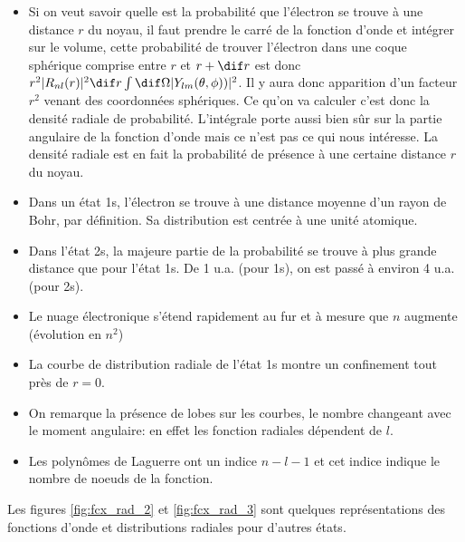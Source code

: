 \begin{itemize}[label=$\bullet$]
    \item Si on veut savoir quelle est la probabilité que l'électron se trouve à une distance $r$ du noyau, il faut prendre le carré de la fonction d'onde et intégrer sur le volume, cette probabilité de trouver l'électron dans une coque sphérique comprise entre $r$ et $r+\dif r$ est donc $r^2|R_{nl}(r)|^2\dif r\int \dif\Omega |Y_{lm}(\theta,\phi))|^2$. Il y aura donc apparition d'un facteur $r^2$ venant des coordonnées sphériques. Ce qu'on va calculer c'est donc la densité radiale de probabilité. L'intégrale porte aussi bien sûr sur la partie angulaire de la fonction d'onde mais ce n'est pas ce qui nous intéresse. La densité radiale est en fait la probabilité de présence à une certaine distance $r$ du noyau.
    \item Dans un état 1s, l'électron se trouve à une distance moyenne d'un rayon de Bohr, par définition. Sa distribution est centrée à une unité atomique.
    \item Dans l'état 2s, la majeure partie de la probabilité se trouve à plus grande distance que pour l'état 1s. De 1 u.a. (pour 1s), on est passé à environ 4 u.a. (pour 2s).
    \item Le nuage électronique s'étend rapidement au fur et à mesure que $n$ augmente (évolution en $n^2$)
    \item La courbe de distribution radiale de l'état 1s montre un confinement tout près de $r=0$.
    \item On remarque la présence de lobes sur les courbes, le nombre changeant avec le moment angulaire: en effet les fonction radiales dépendent de $l$.
    \item Les polynômes de Laguerre ont un indice $n-l-1$ et cet indice indique le nombre de noeuds de la fonction.
\end{itemize}

Les figures \ref{fig:fcx_rad_2} et \ref{fig:fcx_rad_3} sont quelques représentations des fonctions d'onde et distributions radiales pour d'autres états.

